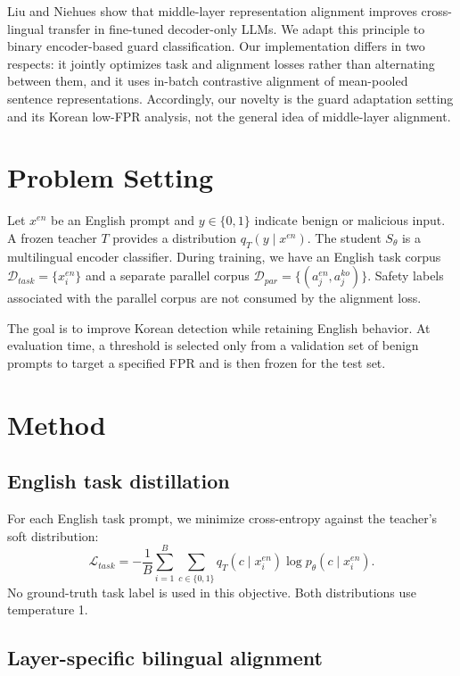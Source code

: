\documentclass[10pt,twocolumn]{article}
\begin{document}
Liu and Niehues \cite{liu2025middle} show that middle-layer representation
alignment improves cross-lingual transfer in fine-tuned decoder-only LLMs. We
adapt this principle to binary encoder-based guard classification. Our
implementation differs in two respects: it jointly optimizes task and alignment
losses rather than alternating between them, and it uses in-batch contrastive
alignment of mean-pooled sentence representations. Accordingly, our novelty is
the guard adaptation setting and its Korean low-FPR analysis, not the general
idea of middle-layer alignment.

\section{Problem Setting}

Let $x^{en}$ be an English prompt and $y\in\{0,1\}$ indicate benign or
malicious input. A frozen teacher $T$ provides a distribution
$q_T(y\mid x^{en})$. The student $S_\theta$ is a multilingual encoder classifier.
During training, we have an English task corpus
$\mathcal{D}_{task}=\{x_i^{en}\}$ and a separate parallel corpus
$\mathcal{D}_{par}=\{(a_j^{en},a_j^{ko})\}$. Safety labels associated with the
parallel corpus are not consumed by the alignment loss.

The goal is to improve Korean detection while retaining English behavior. At
evaluation time, a threshold is selected only from a validation set of benign
prompts to target a specified FPR and is then frozen for the test set.

\section{Method}

\subsection{English task distillation}

For each English task prompt, we minimize cross-entropy against the teacher's
soft distribution:
\begin{equation}
\mathcal{L}_{task}
=-\frac{1}{B}\sum_{i=1}^{B}\sum_{c\in\{0,1\}}
q_T(c\mid x_i^{en})\log p_\theta(c\mid x_i^{en}).
\end{equation}
No ground-truth task label is used in this objective. Both distributions use
temperature 1.

\subsection{Layer-specific bilingual alignment}
\end{document}
